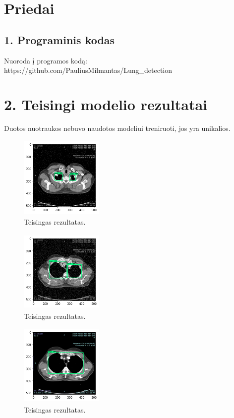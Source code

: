 \documentclass{VUMIFInfKursinis}
\begin{document}
\printbibliography[heading=bibintoc]

\section*{Priedai}
\subsection*{1. Programinis kodas}
Nuoroda į programos kodą: https://github.com/PauliusMilmantas/Lung\_detection
\section*{2. Teisingi modelio rezultatai}
\par
Duotos nuotraukos nebuvo naudotos modeliui treniruoti, jos yra unikalios.
\begin{figure}[ht]
  \centering
  \includegraphics[width=4cm,height=4cm,keepaspectratio]{duom1.png}
  \caption{Teisingas rezultatas.}
  \label{fig:kaukė1}
\end{figure} 

\begin{figure}[ht]
  \centering
  \includegraphics[width=4cm,height=4cm,keepaspectratio]{duom2.png}
  \caption{Teisingas rezultatas.}
  \label{fig:kaukė1}
\end{figure} 
 
\begin{figure}[ht]
  \centering
  \includegraphics[width=4cm,height=4cm,keepaspectratio]{duom3.png}
  \caption{Teisingas rezultatas.}
  \label{fig:kaukė1}
\end{figure} 
\end{document}
